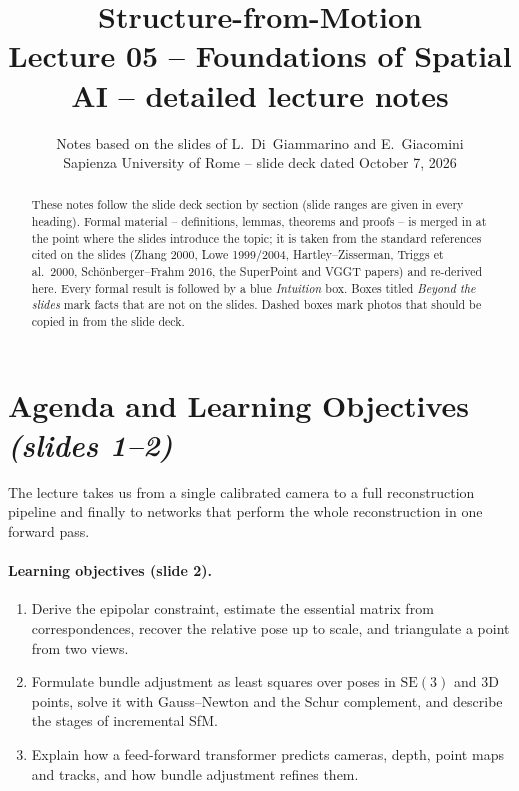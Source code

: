 \documentclass[11pt,a4paper]{article}
\title{\textbf{Structure-from-Motion}\\[4pt]
\large Lecture 05 -- Foundations of Spatial AI -- detailed lecture notes}
\author{Notes based on the slides of L.~Di~Giammarino and E.~Giacomini\\
Sapienza University of Rome -- slide deck dated October 7, 2026}
\date{}
\newcommand{\slr}[1]{\texorpdfstring{\emph{(slides #1)}}{(slides #1)}}
\newcommand{\SE}{\mathrm{SE}(3)}
\begin{document}
\maketitle
\begin{abstract}\noindent
These notes follow the slide deck section by section (slide ranges are given in every
heading). Formal material -- definitions, lemmas, theorems and proofs -- is merged in at
the point where the slides introduce the topic; it is taken from the standard references
cited on the slides (Zhang 2000, Lowe 1999/2004, Hartley--Zisserman, Triggs et al.\ 2000,
Sch\"onberger--Frahm 2016, the SuperPoint and VGGT papers) and re-derived here.
Every formal result is followed by a blue \emph{Intuition} box. Boxes titled
\emph{Beyond the slides} mark facts that are not on the slides. Dashed boxes mark photos that
should be copied in from the slide deck.
\end{abstract}
\tableofcontents
\newpage
\section*{Agenda and Learning Objectives \slr{1--2}}

The lecture takes us from a single calibrated camera to a full reconstruction pipeline and finally
to networks that perform the whole reconstruction in one forward pass.

\begin{center}
\end{center}

\paragraph{Learning objectives (slide 2).}
\begin{enumerate}
\item Derive the epipolar constraint, estimate the essential matrix from correspondences, recover the
 relative pose up to scale, and triangulate a point from two views.
\item Formulate bundle adjustment as least squares over poses in $\SE$ and 3D points, solve it with
 Gauss--Newton and the Schur complement, and describe the stages of incremental SfM.
\item Explain how a feed-forward transformer predicts cameras, depth, point maps and tracks, and how
 bundle adjustment refines them.
\end{enumerate}
\end{document}
